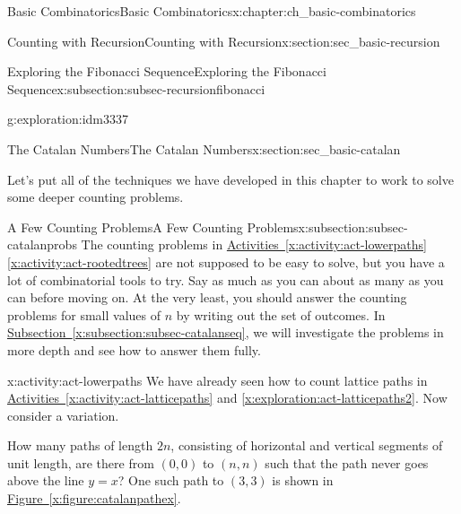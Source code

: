 \documentclass[oneside,10pt,]{book}
\numberwithin{equation}{chapter}
\begin{document}
\begin{chapterptx}{Basic Combinatorics}{}{Basic Combinatorics}{}{}{x:chapter:ch_basic-combinatorics}
\begin{sectionptx}{Counting with Recursion}{}{Counting with Recursion}{}{}{x:section:sec_basic-recursion}
\begin{subsectionptx}{Exploring the Fibonacci Sequence}{}{Exploring the Fibonacci Sequence}{}{}{x:subsection:subsec-recursionfibonacci}
\begin{exploration}{}{g:exploration:idm3337}
\end{exploration}
\end{subsectionptx}
\end{sectionptx}
%
%
\typeout{************************************************}
\typeout{************************************************}
%
\begin{sectionptx}{The Catalan Numbers}{}{The Catalan Numbers}{}{}{x:section:sec_basic-catalan}
\begin{introduction}{}%
Let's put all of the techniques we have developed in this chapter to work to solve some deeper counting problems.%
\end{introduction}%
%
%
\typeout{************************************************}
\typeout{************************************************}
%
\begin{subsectionptx}{A Few Counting Problems}{}{A Few Counting Problems}{}{}{x:subsection:subsec-catalanprobs}
The counting problems in \hyperref[x:activity:act-lowerpaths]{Activities~\ref{x:activity:act-lowerpaths}\textendash{}\ref{x:activity:act-rootedtrees}} are not supposed to be easy to solve, but you have a lot of combinatorial tools to try.  Say as much as you can about as many as you can before moving on.  At the very least, you should answer the counting problems for small values of \(n\) by writing out the set of outcomes.  In \hyperref[x:subsection:subsec-catalanseq]{Subsection~\ref{x:subsection:subsec-catalanseq}}, we will investigate the problems in more depth and see how to answer them fully.%
\begin{activity}{}{x:activity:act-lowerpaths}%
We have already seen how to count lattice paths in \hyperref[x:activity:act-latticepaths]{Activities~\ref{x:activity:act-latticepaths}} and \hyperref[x:exploration:act-latticepaths2]{\ref{x:exploration:act-latticepaths2}}.  Now consider a variation.%
\par
How many paths of length \(2n\), consisting of horizontal and vertical segments of unit length, are there from \((0, 0)\) to \((n, n)\) such that the path never goes above the line \(y = x\)? One such path to \((3, 3)\) is shown in \hyperref[x:figure:catalanpathex]{Figure~\ref{x:figure:catalanpathex}}.%
\begin{figure}
\centering
{
}
\end{figure}
\end{activity}
\end{subsectionptx}
\end{sectionptx}
\end{chapterptx}
\end{document}
